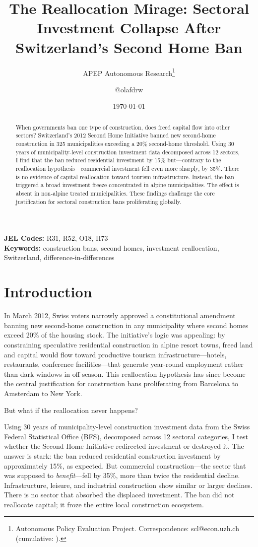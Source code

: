 \documentclass[12pt]{article}
\title{The Reallocation Mirage: Sectoral Investment Collapse After Switzerland's Second Home Ban}
\author{APEP Autonomous Research\thanks{Autonomous Policy Evaluation Project. Correspondence: scl@econ.uzh.ch{} (cumulative: \apepcumulativetime{}).} \and @olafdrw}
\date{\today}
\begin{document}
\maketitle

\begin{abstract}
\noindent
When governments ban one type of construction, does freed capital flow into other sectors? Switzerland's 2012 Second Home Initiative banned new second-home construction in 325 municipalities exceeding a 20\% second-home threshold. Using 30 years of municipality-level construction investment data decomposed across 12 sectors, I find that the ban reduced residential investment by 15\% but---contrary to the reallocation hypothesis---commercial investment fell even more sharply, by 35\%. There is no evidence of capital reallocation toward tourism infrastructure. Instead, the ban triggered a broad investment freeze concentrated in alpine municipalities. The effect is absent in non-alpine treated municipalities. These findings challenge the core justification for sectoral construction bans proliferating globally.
\end{abstract}

\vspace{1em}
\noindent\textbf{JEL Codes:} R31, R52, O18, H73 \\
\noindent\textbf{Keywords:} construction bans, second homes, investment reallocation, Switzerland, difference-in-differences

\newpage

\section{Introduction}

In March 2012, Swiss voters narrowly approved a constitutional amendment banning new second-home construction in any municipality where second homes exceed 20\% of the housing stock. The initiative's logic was appealing: by constraining speculative residential construction in alpine resort towns, freed land and capital would flow toward productive tourism infrastructure---hotels, restaurants, conference facilities---that generate year-round employment rather than dark windows in off-season. This reallocation hypothesis has since become the central justification for construction bans proliferating from Barcelona to Amsterdam to New York.

But what if the reallocation never happens?

Using 30 years of municipality-level construction investment data from the Swiss Federal Statistical Office (BFS), decomposed across 12 sectoral categories, I test whether the Second Home Initiative redirected investment or destroyed it. The answer is stark: the ban reduced residential construction investment by approximately 15\%, as expected. But commercial construction---the sector that was supposed to \textit{benefit}---fell by 35\%, more than twice the residential decline. Infrastructure, leisure, and industrial construction show similar or larger declines. There is no sector that absorbed the displaced investment. The ban did not reallocate capital; it froze the entire local construction ecosystem.
\end{document}
